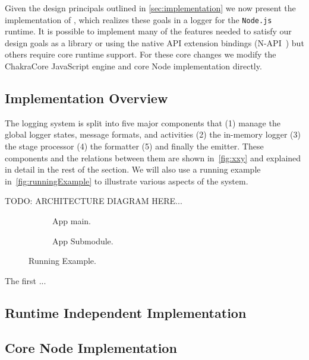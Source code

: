 Given the design principals outlined in \autoref{sec:implementation} we now 
present the implementation of \projn, which realizes these goals in a logger 
for the \texttt{Node.js}~\cite{Node} runtime. It is possible to implement many 
of the features needed to satisfy our design goals as a library or using the 
native API extension bindings (N-API~\cite{NAPI}) but others require core 
runtime support. For these core changes we modify the ChakraCore JavaScript 
engine and core Node implementation directly.

\subsection{Implementation Overview}
The logging system is split into five major components that (1) manage the 
global logger states, message formats, and activities (2) the in-memory logger 
(3) the stage processor (4) the formatter (5) and finally the emitter. These 
components and the relations between them are shown in~\autoref{fig:xxy} and 
explained in detail in the rest of the section. We will also use a running 
example in~\autoref{fig:runningExample} to illustrate various aspects of the 
system.

TODO: ARCHITECTURE DIAGRAM HERE...

\begin{figure*}[t]
\centering
\begin{subfigure}{0.5\textwidth}
    
    \caption{App main.}
    \label{fig:appmain}
\end{subfigure}
\begin{subfigure}{0.5\textwidth}
    
    \caption{App Submodule.}
    \label{fig:appsub}
\end{subfigure}
\caption{Running Example.}
\label{fig:runningExample}
\end{figure*}

The first ...

\subsection{Runtime Independent Implementation}

\subsection{Core Node Implementation}
